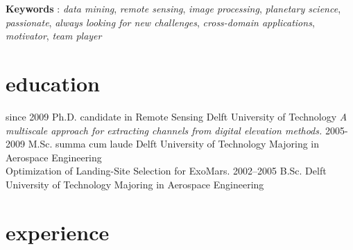 \documentclass[a4paper]{friggeri-cv}
\begin{document}

\textbf{Keywords} : 
\emph{data mining},
\emph{remote sensing},
\emph{image processing},
\emph{planetary science},
\emph{passionate},
\emph{always looking for new challenges},
\emph{cross-domain applications},
\emph{motivator},
\emph{team player}

\section{education}

\begin{entrylist}
  \entry
    {since 2009}
    {Ph.D. {\normalfont candidate in Remote Sensing}}
    {Delft University of Technology}
    {\emph{A multiscale approach for extracting channels from digital elevation methods.}}
  \entry
    {2005-2009}
    {M.Sc. summa cum laude}
    {Delft University of Technology}
    {Majoring in Aerospace Engineering\\
    Optimization of Landing-Site Selection for ExoMars.}
  \entry
    {2002–2005}
    {B.Sc.}
    {Delft University of Technology}
    {Majoring in Aerospace Engineering}
\end{entrylist}

\section{experience}
\end{document}
